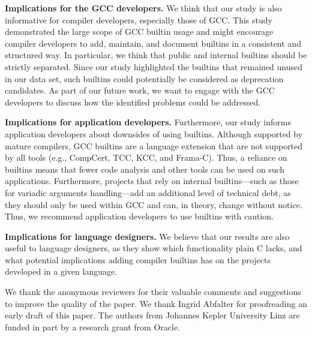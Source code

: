 \documentclass[sigconf,screen]{acmart}
\renewcommand{\paragraph}[1]{\textbf{#1}}
\begin{document}
\paragraph{Implications for the GCC developers.}
We think that our study is also informative for compiler developers, especially those of GCC.
This study demonstrated the large scope of GCC builtin usage and might encourage compiler developers to add, maintain, and document builtins in a consistent and structured way.
In particular, we think that public and internal builtins should be strictly separated.
Since our study highlighted the builtins that remained unused in our data set, such builtins could potentially be considered as deprecation candidates.
As part of our future work, we want to engage with the GCC developers to discuss how the identified problems could be addressed.

\paragraph{Implications for application developers.}
Furthermore, our study informs application developers about downsides of using builtins.
Although supported by mature compilers, GCC builtins are a language extension that are not supported by all tools (e.g., CompCert, TCC, KCC, and Frama-C).
Thus, a reliance on builtins means that fewer code analysis and other tools can be used on such applications.
Furthermore, projects that rely on internal builtins---such as those for variadic arguments handling---add an additional level of technical debt, as they should only be used within GCC and can, in theory, change without notice.
Thus, we recommend application developers to use builtins with caution.

\paragraph{Implications for language designers.}
We believe that our results are also useful to language designers, as they show which functionality plain C lacks, and what potential implications adding compiler builtins has on the projects developed in a given language.

\begin{acks}
We thank the anonymous reviewers for their valuable comments and suggestions to improve the quality of the paper.
We thank Ingrid Abfalter for proofreading an early draft of this paper.
The authors from Johannes Kepler University Linz are funded in part by a research grant from Oracle.
\end{acks}

\balance


\end{document}
